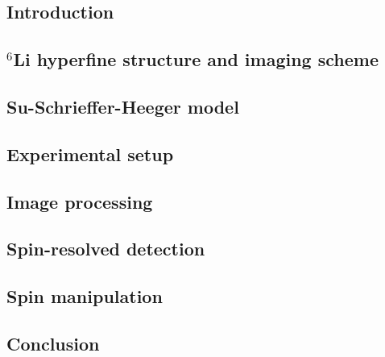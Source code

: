\documentclass[twoside]{article}
\begin{document}
\subsection{Introduction} \label{subsec:imaging-motivation} %


\subsection{\texorpdfstring{$^6$Li}{6Li} hyperfine structure and imaging scheme} \label{subsec:imaging-hyperfine}


\subsection{Su-Schrieffer-Heeger model} \label{subsec:imaging-ssh}

\subsection{Experimental setup} \label{subsec:imaging-setup}

\subsection{Image processing} \label{subsec:imaging-processing}

\subsection{Spin-resolved detection} \label{subsec:imaging-spin}

\subsection{Spin manipulation} \label{subsec:imaging-flip}


\subsection{Conclusion} \label{subsec:imaging-conclusion}

\end{document}
